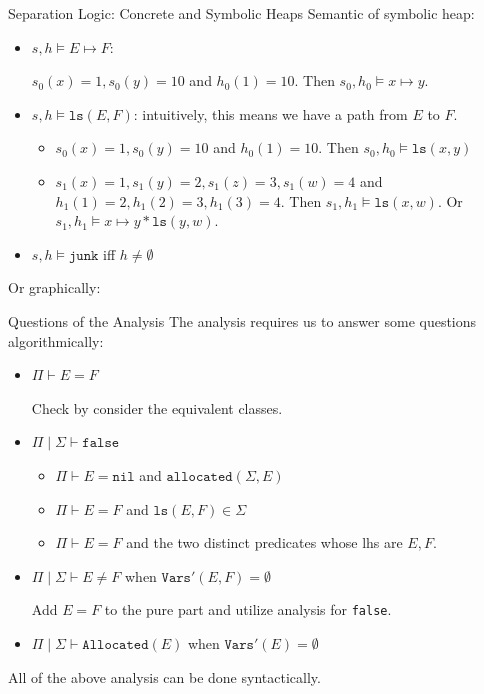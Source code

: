 \documentclass[aspectratio=1610, 13pt]{beamer}
\begin{document}
\begin{frame}{Separation Logic: Concrete and Symbolic Heaps}
Semantic of symbolic heap:
    \begin{example}
    \begin{itemize}
        \item $s,h\models E\mapsto F$: 
        
        $s_0(x) = 1, s_0(y) = 10$ and $h_0(1) = 10$. Then $s_0,h_0\models x\mapsto y$.
        \item $s,h\models \texttt{ls}(E,F)$: intuitively, this means we have a path from $E$ to $F$.
        \begin{itemize}
            \item $s_0(x) = 1, s_0(y) = 10$ and $h_0(1) = 10$. Then $s_0,h_0\models \texttt{ls}(x,y)$
            \item $s_1(x) = 1, s_1(y) = 2, s_1(z) = 3, s_1(w) = 4$ and $h_1(1) = 2, h_1(2)=3, h_1(3) = 4$. Then $s_1, h_1\models \texttt{ls}(x,w)$. Or $s_1, h_1\models x\mapsto y * \texttt{ls}(y,w)$.
        \end{itemize}
        
        
        \item $s,h\models \texttt{junk}$ iff $h\ne \emptyset$
    \end{itemize}
    Or graphically:
    \end{example}
\end{frame}

\begin{frame}{Questions of the Analysis}
The analysis requires us to answer some questions algorithmically:
    \begin{itemize}
        \item $\Pi\vdash E = F$
        
        Check by consider the equivalent classes.
        
        
        
        \item $\Pi\mid \Sigma \vdash \texttt{false}$
        \begin{itemize}
            \item $\Pi\vdash E = \texttt{nil}$ and $\texttt{allocated}(\Sigma, E)$
            \item $\Pi\vdash E = F$ and $\texttt{ls}(E,F)\in \Sigma$
            \item $\Pi\vdash E = F$ and the two distinct predicates whose lhs are $E,F$.
        \end{itemize}
        \item $\Pi\mid \Sigma \vdash E\ne F $ when $\texttt{Vars}'(E, F)=\emptyset$
        
        Add $E = F$ to the pure part and utilize analysis for \texttt{false}.
        
        \item $\Pi\mid \Sigma \vdash \texttt{Allocated}(E)$ when $ \texttt{Vars}'(E)=\emptyset$
    \end{itemize}
    All of the above analysis can be done syntactically.
\end{frame}
\end{document}
